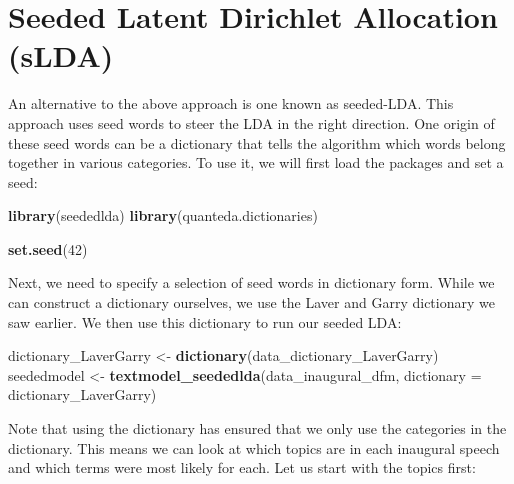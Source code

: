 \documentclass[
]{book}
\newenvironment{Shaded}{\begin{snugshade}}{\end{snugshade}}
\newcommand{\AttributeTok}[1]{\textcolor[rgb]{0.13,0.29,0.53}{#1}}
\newcommand{\DecValTok}[1]{\textcolor[rgb]{0.00,0.00,0.81}{#1}}
\newcommand{\FunctionTok}[1]{\textcolor[rgb]{0.13,0.29,0.53}{\textbf{#1}}}
\newcommand{\NormalTok}[1]{#1}
\newcommand{\OtherTok}[1]{\textcolor[rgb]{0.56,0.35,0.01}{#1}}
\begin{document}
\section{Seeded Latent Dirichlet Allocation (sLDA)}\label{seeded-latent-dirichlet-allocation-slda}

An alternative to the above approach is one known as seeded-LDA. This approach uses seed words to steer the LDA in the right direction. One origin of these seed words can be a dictionary that tells the algorithm which words belong together in various categories. To use it, we will first load the packages and set a seed:

\begin{Shaded}
\begin{Highlighting}[]
\FunctionTok{library}\NormalTok{(seededlda)}
\FunctionTok{library}\NormalTok{(quanteda.dictionaries)}

\FunctionTok{set.seed}\NormalTok{(}\DecValTok{42}\NormalTok{)}
\end{Highlighting}
\end{Shaded}

Next, we need to specify a selection of seed words in dictionary form. While we can construct a dictionary ourselves, we use the Laver and Garry dictionary we saw earlier. We then use this dictionary to run our seeded LDA:

\begin{Shaded}
\begin{Highlighting}[]
\NormalTok{dictionary\_LaverGarry }\OtherTok{\textless{}{-}} \FunctionTok{dictionary}\NormalTok{(data\_dictionary\_LaverGarry)}
\NormalTok{seededmodel }\OtherTok{\textless{}{-}} \FunctionTok{textmodel\_seededlda}\NormalTok{(data\_inaugural\_dfm, }\AttributeTok{dictionary =}\NormalTok{ dictionary\_LaverGarry)}
\end{Highlighting}
\end{Shaded}

Note that using the dictionary has ensured that we only use the categories in the dictionary. This means we can look at which topics are in each inaugural speech and which terms were most likely for each. Let us start with the topics first:
\end{document}
